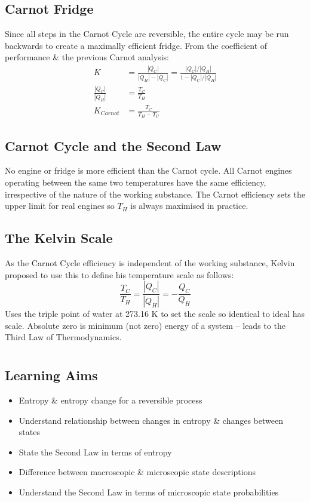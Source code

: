 \documentclass[a4paper, 11pt, normalem]{report}
\begin{document}
\section{Carnot Fridge}
Since all steps in the Carnot Cycle are reversible, the entire cycle may be run backwards to create a maximally efficient fridge.
From the coefficient of performance \& the previous Carnot analysis:
\begin{align}
    K &= \frac{|Q_{C}|}{|Q_{H}| - |Q_{C}|} = \frac{|Q_{C}|/|Q_{H}|}{1 - |Q_{C}|/|Q_{H}|} \\
    \frac{|Q_{C}|}{|Q_{H}|} &= \frac{T_{C}}{T_{H}} \\
    K_{Carnot} &= \frac{T_{C}}{T_{H} - T_{C}}
\end{align}

\section{Carnot Cycle and the Second Law}
No engine or fridge is more efficient than the Carnot cycle.
All Carnot engines operating between the same two temperatures have the same efficiency, irrespective of the nature of the working substance.
The Carnot efficiency sets the upper limit for real engines so $T_{H}$ is always maximised in practice.

\section{The Kelvin Scale}
As the Carnot Cycle efficiency is independent of the working substance, Kelvin proposed to use this to define his temperature scale as follows:
\begin{equation}
	\frac{T_{C}}{T_{H}} = \frac{|Q_{C}|}{|Q_{H}|} = -\frac{Q_{C}}{Q_{H}}
\end{equation}
Uses the triple point of water at 273.16 K to set the scale so identical to ideal has scale.
Absolute zero is minimum (not zero) energy of a system -- leads to the Third Law of Thermodynamics.

\chapter{}
\section{Learning Aims}
\begin{itemize}
	\item Entropy \& entropy change for a reversible process
	\item Understand relationship between changes in entropy \& changes between states
	\item State the Second Law in terms of entropy
	\item Difference between macroscopic \& microscopic state descriptions
	\item Understand the Second Law in terms of microscopic state probabilities
\end{itemize}
\end{document}
